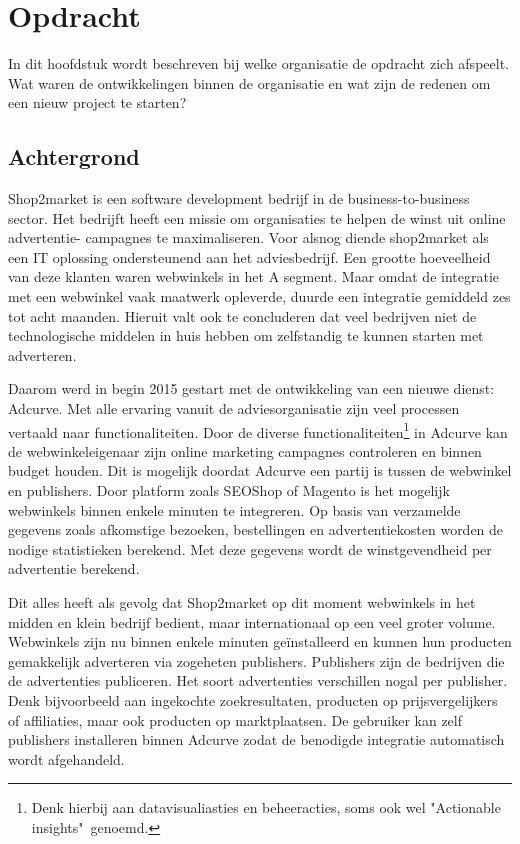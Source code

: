 
\chapter{Opdracht}

In dit hoofdstuk wordt beschreven bij welke organisatie de opdracht zich afspeelt. Wat waren de ontwikkelingen binnen de organisatie en wat zijn de redenen om een nieuw project te starten?

\section{Achtergrond}

Shop2market is een software development bedrijf in de business-to-business sector. Het bedrijft heeft een missie om organisaties te helpen de winst uit online advertentie- campagnes te maximaliseren. 
Voor alsnog diende shop2market als een IT oplossing ondersteunend aan het adviesbedrijf. Een grootte hoeveelheid van deze klanten waren webwinkels in het A segment. Maar omdat de integratie met een webwinkel vaak maatwerk opleverde, duurde een integratie gemiddeld zes tot acht maanden. Hieruit valt ook te concluderen dat veel bedrijven niet de technologische middelen in huis hebben om zelfstandig te kunnen starten met adverteren.

Daarom werd in begin 2015 gestart met de ontwikkeling van een nieuwe dienst: Adcurve. Met alle ervaring vanuit de adviesorganisatie zijn veel processen vertaald naar functionaliteiten. Door de diverse functionaliteiten\footnote{ Denk hierbij aan datavisualiasties en beheeracties, soms ook wel "Actionable insights"\  genoemd.} in Adcurve kan de webwinkeleigenaar zijn online marketing campagnes controleren en binnen budget houden. Dit is mogelijk doordat Adcurve een partij is tussen de webwinkel en publishers. Door platform zoals SEOShop of Magento is het mogelijk webwinkels binnen enkele minuten te integreren. 
Op basis van verzamelde gegevens zoals afkomstige bezoeken, bestellingen en advertentiekosten worden de nodige statistieken berekend. Met deze gegevens wordt de winstgevendheid per advertentie berekend.


Dit alles heeft als gevolg dat Shop2market op dit moment webwinkels in het midden en klein bedrijf  bedient, maar internationaal op een veel groter volume. Webwinkels zijn nu binnen enkele minuten geïnstalleerd en kunnen hun producten gemakkelijk adverteren via zogeheten publishers. Publishers zijn de bedrijven die de advertenties publiceren. Het soort advertenties verschillen nogal per publisher. Denk bijvoorbeeld aan ingekochte zoekresultaten, producten op prijsvergelijkers of affiliaties, maar ook producten op marktplaatsen. De gebruiker kan zelf publishers installeren binnen Adcurve zodat de benodigde integratie automatisch wordt afgehandeld. 


